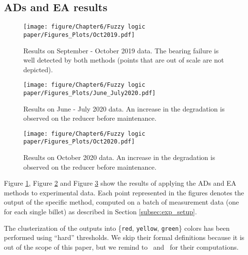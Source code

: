 \subsection{ADs and EA results}

\begin{figure}[!ht]
    \centering
    \texttt{[image: figure/Chapter6/Fuzzy logic paper/Figures\_Plots/Oct2019.pdf]} 
    \caption{Results on September - October 2019 data. The bearing failure is well detected by both methods (points that are out of scale are not depicted).}
    \label{fig:oct2019}
\end{figure}  

\begin{figure}[!ht]
    \centering
    \texttt{[image: figure/Chapter6/Fuzzy logic paper/Figures\_Plots/June\_July2020.pdf]}
    \caption{Results on June - July 2020 data. An increase in the degradation is observed on the reducer before maintenance.}\vspace{-0.3cm}
    \label{fig:jun2020}
\end{figure}


\begin{figure}[!ht]
    \centering
    \texttt{[image: figure/Chapter6/Fuzzy logic paper/Figures\_Plots/Oct2020.pdf]}
    \caption{Results on October 2020 data. An increase in the degradation is observed on the reducer before maintenance.}
    \label{fig:oct2020}
\end{figure}

Figure \ref{fig:oct2019}, Figure \ref{fig:jun2020}
and Figure \ref{fig:oct2020} show the results of applying the ADs and EA methods to experimental data. Each point represented in the figures denotes the output of the specific method, computed on a batch of measurement data (one for each single billet) as described in Section \ref{subsec:exp_setup}. 


{The clusterization of the outputs into \{\texttt{red}, \texttt{yellow}, \texttt{green}\} colors has been performed using ``hard'' thresholds. We skip their formal definitions because it is out of the scope of this paper, but we remind to~\cite{sarda2021} and~\cite{russoOCSVM} for their computations.}

